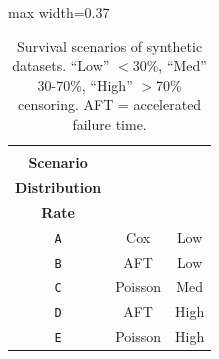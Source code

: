 \documentclass{article} %
\begin{document}
\begin{table}
    \centering
    \vspace{-.5em}
    \caption{Survival scenarios of synthetic datasets. ``Low'' $<$30\%, ``Med'' 30-70\%, ``High'' $>$70\% censoring. AFT = accelerated failure time.}
    \label{tab:synthetic-data-survival-scenario}
    \vspace{-0.5em}
    \begin{adjustbox}{max width=0.37\textwidth}
    \begin{tabular}{ccc}
        \toprule
        \makecell[c]{\textbf{Survival}\\\textbf{Scenario}} & \makecell[c]{\textbf{Survival Time}\\\textbf{Distribution}} & \makecell[c]{\textbf{Censoring}\\\textbf{Rate}} \\ 
        \midrule
        \texttt{A} & Cox & Low \\
        \texttt{B} & AFT & Low \\
        \texttt{C} & Poisson & Med \\
        \texttt{D} & AFT & High \\
        \texttt{E} & Poisson & High \\
        \bottomrule
    \end{tabular}
    \end{adjustbox}
\end{table}


\end{document}

